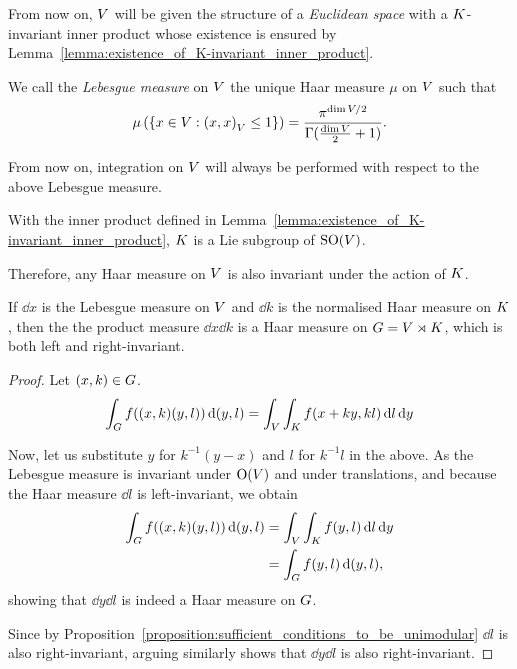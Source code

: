 From now on, $V$ will be given the structure of a \emph{Euclidean space} with a $K$-invariant inner product
whose existence is ensured by Lemma~\ref{lemma:existence_of_K-invariant_inner_product}.

\begin{definition}
    We call the \emph{Lebesgue measure} on $V$
    the unique Haar measure $\mu$ on $V$ such that
    \begin{align*}
        \mu\left(\{x \in V : {\left(x, x\right)_{V}} \leq 1\}\right) = \frac{\pi^{\dim V/2}}{\Gamma(\frac{\dim V}{2} + 1)}.
    \end{align*}
\end{definition}

From now on, integration on $V$ will always be performed with respect to the above Lebesgue measure.

\begin{lemma}
\label{lemma:K_subset_of_SO_and_invariance_of_the_induced_Lebesgue_measure}
    With the inner product defined in Lemma~\ref{lemma:existence_of_K-invariant_inner_product},
    $K$ is a Lie subgroup of ${\mathrm{SO} (V)}$.

    Therefore, any Haar measure on $V$ is also invariant under the action of $K$.
\end{lemma}

\begin{lemma}
\label{lemma:Haar_measure}
    If $\dd x$ is the Lebesgue measure on $V$ and $\dd k$ is the normalised Haar measure on $K$,
    then the the product measure $\dd x \dd k$ is a Haar measure on $G = V \rtimes K$,
    which is both left and right-invariant.
\end{lemma}
\begin{proof}
    Let $(x, k) \in G$.
    \begin{align*}
        \int_G f((x, k) (y, l)) \,\mathrm{d} (y, l)
        = \int_V \int_K f(x + ky, k l) \,\mathrm{d} l \,\mathrm{d} y
    \end{align*}

    Now, let us substitute $y$ for $k^{-1}(y - x)$ and $l$ for $k^{-1} l$ in the above.
    As the Lebesgue measure is invariant under ${\mathrm{O} (V)}$ and under translations,
    and because the Haar measure $\dd l$ is left-invariant,
    we obtain
    \begin{align*}
        \int_G f((x, k) (y, l)) \,\mathrm{d} (y, l)
        &= \int_V \int_K f(y, l) \,\mathrm{d} l \,\mathrm{d} y\\
        &= \int_G f(y, l) \,\mathrm{d} (y, l),
    \end{align*}
    showing that $\dd y \dd l$ is indeed a Haar measure on $G$.

    Since by Proposition~\ref{proposition:sufficient_conditions_to_be_unimodular} $\dd l$ is also right-invariant,
    arguing similarly shows that $\dd y \dd l$ is also right-invariant.
\end{proof}

